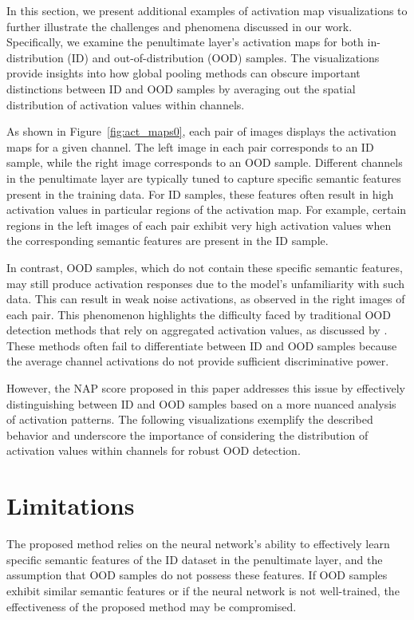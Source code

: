 In this section, we present additional examples of activation map visualizations to further illustrate the challenges and phenomena discussed in our work. Specifically, we examine the penultimate layer's activation maps for both in-distribution (ID) and out-of-distribution (OOD) samples. The visualizations provide insights into how global pooling methods can obscure important distinctions between ID and OOD samples by averaging out the spatial distribution of activation values within channels.

As shown in Figure~\ref{fig:act_maps0}, each pair of images displays the activation maps for a given channel. The left image in each pair corresponds to an ID sample, while the right image corresponds to an OOD sample. Different channels in the penultimate layer are typically tuned to capture specific semantic features present in the training data. For ID samples, these features often result in high activation values in particular regions of the activation map. For example, certain regions in the left images of each pair exhibit very high activation values when the corresponding semantic features are present in the ID sample.

In contrast, OOD samples, which do not contain these specific semantic features, may still produce activation responses due to the model's unfamiliarity with such data. This can result in weak noise activations, as observed in the right images of each pair. This phenomenon highlights the difficulty faced by traditional OOD detection methods that rely on aggregated activation values, as discussed by \cite{sun2021react}. These methods often fail to differentiate between ID and OOD samples because the average channel activations do not provide sufficient discriminative power.

However, the NAP score proposed in this paper addresses this issue by effectively distinguishing between ID and OOD samples based on a more nuanced analysis of activation patterns. The following visualizations exemplify the described behavior and underscore the importance of considering the distribution of activation values within channels for robust OOD detection.
\section{Limitations}
\label{appendix:limit}
The proposed method relies on the neural network's ability to effectively learn specific semantic features of the ID dataset in the penultimate layer, and the assumption that OOD samples do not possess these features. If OOD samples exhibit similar semantic features or if the neural network is not well-trained, the effectiveness of the proposed method may be compromised.

